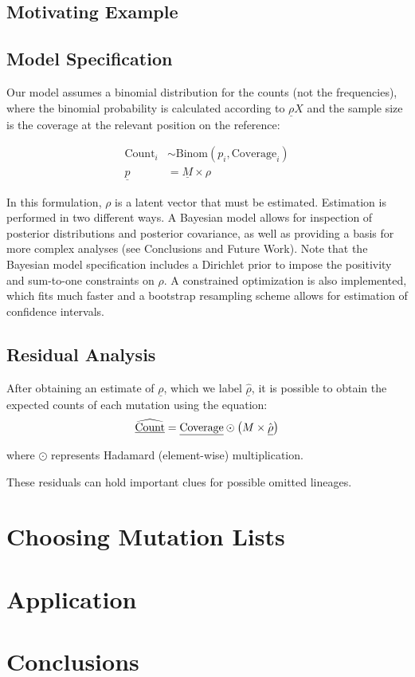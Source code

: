 \documentclass{article}
\begin{document}
\subsection{Motivating Example}


\subsection{Model Specification}

Our model assumes a binomial distribution for the counts (not the frequencies), where the binomial probability is calculated according to $\underline \rho X$ and the sample size is the coverage at the relevant position on the reference:

$$
\begin{aligned}
\text{Count}_i &\sim \text{Binom}(p_i, \text{Coverage}_i)\\
\underline p &= \underline M \times \rho
\end{aligned}
$$

In this formulation, $\rho$ is a latent vector that must be estimated.
Estimation is performed in two different ways.
A Bayesian model allows for inspection of posterior distributions and posterior covariance, as well as providing a basis for more complex analyses (see Conclusions and Future Work).
Note that the Bayesian model specification includes a Dirichlet prior to impose the positivity and sum-to-one constraints on $\rho$.
A constrained optimization is also implemented, which fits much faster and a bootstrap resampling scheme allows for estimation of confidence intervals.

\subsection{Residual Analysis}

After obtaining an estimate of $\underline\rho$, which we label $\hat{\underline\rho}$, it is possible to obtain the expected counts of each mutation using the equation:
$$\widehat{\text{\underline{Count}}} = \text{\underline{Coverage}}\odot\left(M\times\hat{\underline\rho}\right)$$

\noindent where $\odot$ represents Hadamard (element-wise) multiplication.

These residuals can hold important clues for possible omitted lineages.

\section{Choosing Mutation Lists}

\section{Application}

\section{Conclusions}
\end{document}
